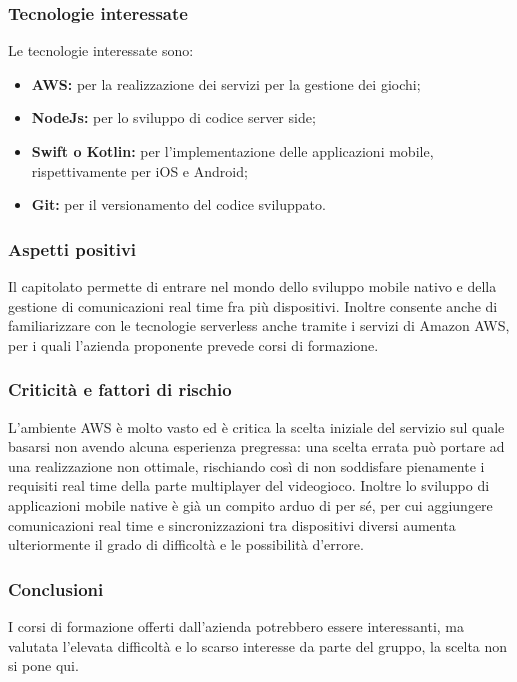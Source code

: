 \subsubsection{Tecnologie interessate}
    Le tecnologie interessate sono:
    \begin{itemize}
    	\item \textbf{AWS: }per la realizzazione dei servizi per la gestione dei giochi;
    	\item \textbf{NodeJs: }per lo sviluppo di codice server side;
    	\item \textbf{Swift o Kotlin: }per l'implementazione delle applicazioni mobile, rispettivamente per iOS e Android;
    	\item \textbf{Git: }per il versionamento del codice sviluppato.
    \end{itemize}
\subsubsection{Aspetti positivi}
    Il capitolato permette di entrare nel mondo dello sviluppo mobile nativo e della gestione di comunicazioni real time fra più dispositivi. Inoltre consente anche di familiarizzare con le tecnologie serverless anche tramite i servizi di Amazon AWS, per i quali l'azienda proponente prevede corsi di formazione.
\subsubsection{Criticità e fattori di rischio}
    L'ambiente AWS è molto vasto ed è critica la scelta iniziale del servizio sul quale basarsi non avendo alcuna esperienza pregressa: una scelta errata può portare ad una realizzazione non ottimale, rischiando così di non soddisfare pienamente i requisiti real time della parte multiplayer del videogioco. Inoltre lo sviluppo di applicazioni mobile native è già un compito arduo di per sé, per cui aggiungere comunicazioni real time e sincronizzazioni tra dispositivi diversi aumenta ulteriormente il grado di difficoltà e le possibilità d'errore.
\subsubsection{Conclusioni}
    I corsi di formazione offerti dall'azienda potrebbero essere interessanti, ma valutata l'elevata difficoltà e lo scarso interesse da parte del gruppo, la scelta non si pone qui.